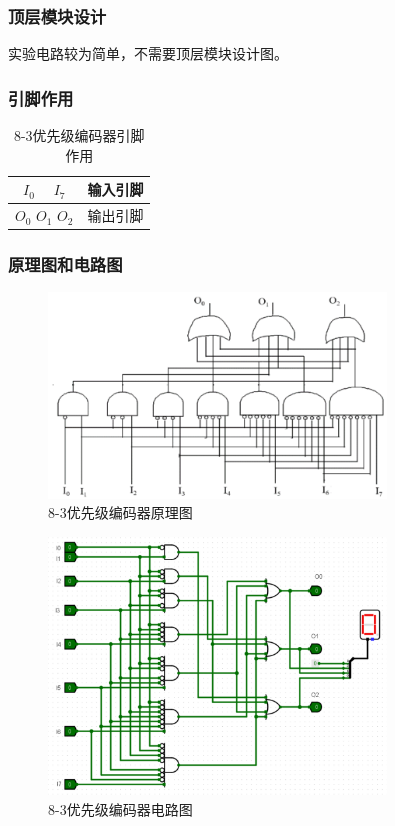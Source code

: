 \documentclass{article}
\begin{document}
    \subsubsection{顶层模块设计}
    实验电路较为简单，不需要顶层模块设计图。

    \subsubsection{引脚作用}
    \begin{table}[H]
    \centering
    \begin{tabular}{|c|c|}
        \hline
        $I_{0}$ ~ $I_{7}$ & 输入引脚 \\ \hline
        $O_{0}$ $O_{1}$ $O_{2}$   & 输出引脚 \\ \hline
    \end{tabular}
    \caption{8-3优先级编码器引脚作用}
    \end{table}

    \subsubsection{原理图和电路图}
    \begin{figure}[H]
    \centering
    \includegraphics[width=0.8\textwidth]{2.4.1.png}
    \caption{8-3优先级编码器原理图}
    \end{figure}

    \begin{figure}[H]
    \centering
    \includegraphics[width=0.8\textwidth]{2.4.2.png}
    \caption{8-3优先级编码器电路图}
    \end{figure}
\end{document}
